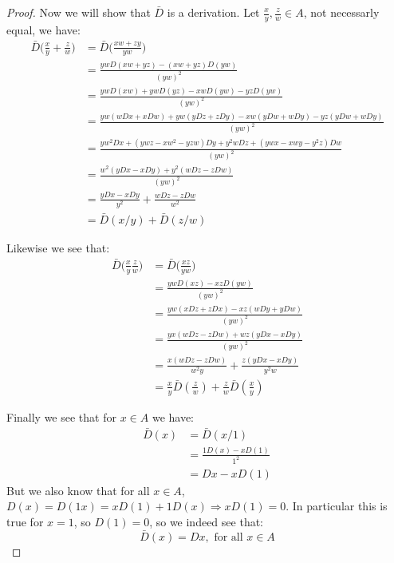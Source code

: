 \documentclass{article}
\theoremstyle{definition}
\theoremstyle{remark}
\theoremstyle{definition}
\begin{document}
\begin{enumerate}[label={(\alph*)}]
\begin{proof}
        Now we will show that $\bar D$ is a derivation. Let $\frac{x}{y},\frac{z}{w}\in A$, not necessarly equal, we have:\begin{align}
            \bar{D}\bigg(\frac{x}{y}+\frac{z}{w}\bigg) &= \bar{D}\bigg(\frac{xw+zy}{yw}\bigg)\\
            &= \frac{ywD(xw+yz)-(xw+yz)D(yw)}{{(yw)}^2}\\
            &= \frac{ywD(xw)+ywD(yz)-xwD(yw)-yzD(yw)}{{(yw)}^2}\\
            &= \frac{yw(wDx+xDw)+yw(yDz+zDy)-xw(yDw+wDy)-yz(yDw+wDy)}{{(yw)}^2}\\
            &= \frac{yw^2Dx+(ywz-xw^2-yzw)Dy+y^2wDz+(ywx-xwy-y^2z)Dw}{{(yw)}^2}\\
            &= \frac{w^2(yDx-xDy)+y^2(wDz-zDw)}{{(yw)}^2}\\
            &= \frac{yDx-xDy}{y^2}+\frac{wDz-zDw}{{w}^2}\\
            &= \bar{D}(x/y)+\bar{D}(z/w)
            \end{align}

        Likewise we see that:\begin{align}
            \bar{D}\bigg(\frac{x}{y}\frac{z}{w}\bigg) &= \bar{D}\bigg(\frac{xz}{yw}\bigg)\\
                    &= \frac{ywD(xz)-xzD(yw)}{{(yw)}^2}\\
                    &= \frac{yw(xDz+zDx)-xz(wDy+yDw)}{{(yw)}^2}\\
                    &= \frac{yx(wDz-zDw)+wz(yDx-xDy)}{{(yw)}^2}\\
                    &= \frac{x(wDz-zDw)}{w^2y}+\frac{z(yDx-xDy)}{y^2w}\\
                    &= \frac{x}{y}\bar{D}(\frac{z}{w}) + \frac{z}{w}\bar{D}(\frac{x}{y})
        \end{align}

        Finally we see that for $x\in A$ we have:\begin{align}
            \bar{D}(x) &= \bar{D}(x/1)\\
            &= \frac{1D(x)-xD(1)}{1^2}\\
            &= Dx-xD(1)
        \end{align}
        But we also know that for all $x\in A$, $D(x) = D(1x) = xD(1)+1D(x)\Rightarrow xD(1) = 0$. In particular this is true for $x=1$, so $D(1) = 0$, so we indeed see that:\begin{equation}
            \bar{D}(x) = Dx, \text{ for all }x\in A
        \end{equation}
    \end{proof}
    

\end{enumerate}
\end{document}
